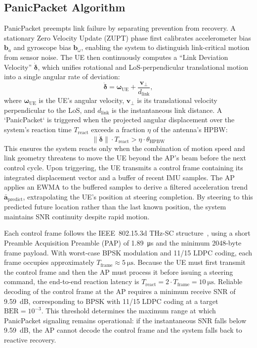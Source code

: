 \documentclass[fleqn,10pt]{wlscirep}
\begin{document}
\subsection*{PanicPacket Algorithm}
PanicPacket preempts link failure by separating prevention from recovery. A stationary Zero Velocity Update (ZUPT) phase first calibrates accelerometer bias $\mathbf{b}_a$ and gyroscope bias $\mathbf{b}_\omega$, enabling the system to distinguish link-critical motion from sensor noise. The UE then continuously computes a ``Link Deviation Velocity'' $\dot{\boldsymbol{\delta}}$, which unifies rotational and LoS-perpendicular translational motion into a single angular rate of deviation:
\begin{equation}
    \dot{\boldsymbol{\delta}} = \boldsymbol{\omega}_{\text{UE}} + \frac{\mathbf{v}_{\perp}}{d_{\text{link}}},
\end{equation}
where $\boldsymbol{\omega}_{\text{UE}}$ is the UE's angular velocity, $\mathbf{v}_{\perp}$ is its translational velocity perpendicular to the LoS, and $d_{\text{link}}$ is the instantaneous link distance. A `PanicPacket` is triggered when the projected angular displacement over the system's reaction time $T_{\text{react}}$ exceeds a fraction $\eta$ of the antenna's HPBW:
\begin{equation}
    \|\dot{\boldsymbol{\delta}}\| \cdot T_{\text{react}} > \eta \cdot \theta_{\text{HPBW}}
\end{equation}
This ensures the system reacts only when the combination of motion speed and link geometry threatens to move the UE beyond the AP's beam before the next control cycle. Upon triggering, the UE transmits a control frame containing its integrated displacement vector and a buffer of recent IMU samples. The AP applies an EWMA to the buffered samples to derive a filtered acceleration trend $\bar{\mathbf{a}}_{\text{predict}}$, extrapolating the UE's position at steering completion. By steering to this predicted future location rather than the last known position, the system maintains SNR continuity despite rapid motion.

Each control frame follows the IEEE~802.15.3d THz-SC structure~\cite{9269931}, using a short Preamble Acquisition Preamble (PAP) of \SI{1.89}{\micro\second} and the minimum 2048-byte frame payload. With worst-case BPSK modulation and 11/15 LDPC coding, each frame occupies approximately $T_{\text{frame}} \approx \SI{5}{\micro\second}$. Because the UE must first transmit the control frame and then the AP must process it before issuing a steering command, the end-to-end reaction latency is $T_{\text{react}} = 2 \cdot T_{\text{frame}} = \SI{10}{\micro\second}$. Reliable decoding of the control frame at the AP requires a minimum receive SNR of \SI{9.59}{\deci\bel}, corresponding to BPSK with 11/15 LDPC coding at a target $\text{BER} = 10^{-3}$. This threshold determines the maximum range at which PanicPacket signaling remains operational: if the instantaneous SNR falls below \SI{9.59}{\deci\bel}, the AP cannot decode the control frame and the system falls back to reactive recovery.
\end{document}
